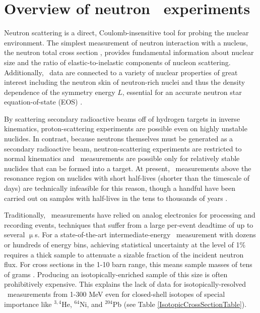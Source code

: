 \section{Overview of neutron \tot\ experiments}

Neutron scattering is a direct, Coulomb-insensitive tool for probing the nuclear
environment. The simplest measurement of neutron interaction with a nucleus,
the neutron total cross section \tot, provides fundamental information about
nuclear size and the ratio of elastic-to-inelastic components of nucleon 
scattering. Additionally, \tot\ data are connected to a variety of nuclear
properties of great interest including the neutron skin of neutron-rich nuclei
\cite{Mahzoon2017} and thus the density dependence of the symmetry energy $L$,
essential for an accurate neutron star equation-of-state (EOS)
\cite{Fattoyev2012, Vinas2014, Brown2000}.

By scattering secondary radioactive beams off of hydrogen targets in \gls{inverse
kinematics}, proton-scattering experiments are possible even on highly unstable
nuclides. In contrast, because neutrons themselves must be generated as a
secondary radioactive beam, neutron-scattering experiments are restricted to
normal kinematics and \tot\ measurements are possible only for relatively stable
nuclides that can be formed into a target. At present, \tot\ measurements above
the resonance region on nuclides with short half-lives (shorter than the timescale of
days) are technically infeasible for this reason, though a handful have been carried out on
samples with half-lives in the tens to thousands of years \cite{Poenitz1983,
Phillips1980, Foster1971}.

Traditionally, \tot\ measurements have relied on analog electronics for processing and
recording events, techniques that suffer from a large per-event deadtime of
up to several $\upmu$s. For a state-of-the-art intermediate-energy \tot\ measurement
with dozens or hundreds of energy bins, achieving statistical uncertainty at the
level of 1\% requires a thick sample to attenuate a sizable fraction of the
incident neutron flux.
For cross sections in the 1-10 barn range, this means
sample masses of tens of grams \cite{Finlay1993, Abfalterer2001}.
Producing an isotopically-enriched sample of this size is often
prohibitively expensive. This explains the lack of data for isotopically-resolved
\tot\ measurements from 1-300 MeV even for
closed-shell isotopes of special importance like $^{3,4}$He, $^{64}$Ni, and
$^{204}$Pb (see Table \ref{IsotopicCrossSectionTable}).

